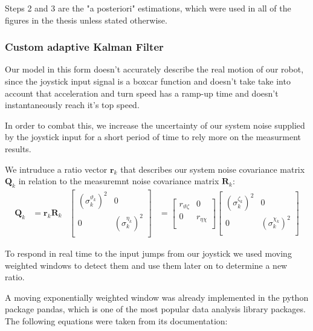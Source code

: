 \documentclass[class=article, crop=false]{standalone}
\begin{document}
\vspace{0.5cm}

Steps 2 and 3 are the "a posteriori" estimations, which were used in all of the figures in the thesis unless stated otherwise.

\subsubsection{Custom adaptive Kalman Filter}

Our model in this form doesn't accurately describe the real motion of our robot, since the joystick input signal is a boxcar function and doesn't take take into account that acceleration and turn speed has a ramp-up time and doesn't instantaneously reach it's top speed.

In order to combat this, we increase the uncertainty of our system noise supplied by the joystick input for a short period of time to rely more on the measurment results.

We intruduce a ratio vector $\textbf{r}_k$ that describes our system noise covariance matrix $\textbf{Q}_k$ in relation to the measuremnt noise covariance matrix $\textbf{R}_k$:
\begin{align*}
 \textbf{Q}_k              & =  \textbf{r}_k \textbf{R}_k &
 \begin{bmatrix}
  (\sigma^{\vartheta_k}_k)^2 & 0                     \\
  0                          & (\sigma^{\eta_k}_k)^2 \\
 \end{bmatrix} & =  \begin{bmatrix}
  r_{\vartheta\zeta} & 0      \\
  0      & r_{\eta\chi} \\
 \end{bmatrix}
 \begin{bmatrix}
  (\sigma^{\zeta_k}_k)^2 & 0                     \\
  0                      & (\sigma^{\chi_k}_k)^2 \\
 \end{bmatrix}
\end{align*}\label{eq:ratio}

To respond in real time to the input jumps from our joystick we used moving weighted windows to detect them and use them later on to determine a new ratio.

A moving exponentially weighted window was already implemented in the python package pandas, which is one of the most popular data analysis library packages. The following equations were taken from its documentation\footnotemark:
\end{document}
